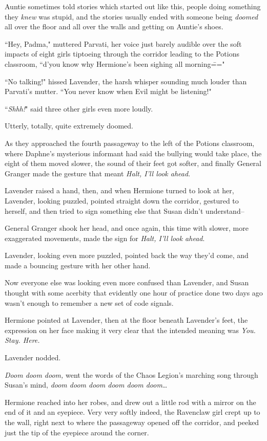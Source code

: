 Auntie sometimes told stories which started out like this, people doing something they \emph{knew} was stupid, and the stories usually ended with someone being \emph{doomed} all over the floor and all over the walls and getting on Auntie's shoes.

``Hey, Padma," muttered Parvati, her voice just barely audible over the soft impacts of eight girls tiptoeing through the corridor leading to the Potions classroom, ``d'you know why Hermione's been sighing all morning\==="

``No talking!" hissed Lavender, the harsh whisper sounding much louder than Parvati's mutter. ``You never know when Evil might be listening!"

``\emph{Shhh!}" said three other girls even more loudly.

Utterly, totally, quite extremely doomed.

As they approached the fourth passageway to the left of the Potions classroom, where Daphne's mysterious informant had said the bullying would take place, the eight of them moved slower, the sound of their feet got softer, and finally General Granger made the gesture that meant \emph{Halt, I'll look ahead}.

Lavender raised a hand, then, and when Hermione turned to look at her, Lavender, looking puzzled, pointed straight down the corridor, gestured to herself, and then tried to sign something else that Susan didn't understand\---

General Granger shook her head, and once again, this time with slower, more exaggerated movements, made the sign for \emph{Halt, I'll look ahead}.

Lavender, looking even more puzzled, pointed back the way they'd come, and made a bouncing gesture with her other hand.

Now everyone else was looking even more confused than Lavender, and Susan thought with some acerbity that evidently one hour of practice done two days ago wasn't enough to remember a new set of code signals.

Hermione pointed at Lavender, then at the floor beneath Lavender's feet, the expression on her face making it very clear that the intended meaning was \emph{You. Stay. Here.}

Lavender nodded.

\emph{Doom doom doom,} went the words of the Chaos Legion's marching song through Susan's mind, \emph{doom doom doom doom doom doom}{\ldots}

Hermione reached into her robes, and drew out a little rod with a mirror on the end of it and an eyepiece. Very very softly indeed, the Ravenclaw girl crept up to the wall, right next to where the passageway opened off the corridor, and peeked just the tip of the eyepiece around the corner.

